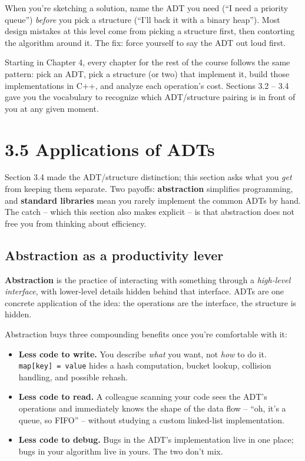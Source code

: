 \documentclass[11pt]{article}
\begin{document}
\begin{ideabox}
When you're sketching a solution, name the ADT you need
(``I need a priority queue'') \emph{before} you pick a structure
(``I'll back it with a binary heap''). Most design mistakes at this
level come from picking a structure first, then contorting the
algorithm around it. The fix: force yourself to say the ADT out
loud first.
\end{ideabox}

\begin{notebox}
Starting in Chapter 4, every chapter for the rest of the course
follows the same pattern: pick an ADT, pick a structure (or two) that
implement it, build those implementations in C++, and analyze each
operation's cost. Sections 3.2 -- 3.4 gave you the vocabulary to
recognize which ADT/structure pairing is in front of you at any
given moment.
\end{notebox}

\section{3.5 Applications of ADTs}

Section 3.4 made the ADT/structure distinction; this section asks
what you \emph{get} from keeping them separate. Two payoffs:
\textbf{abstraction} simplifies programming, and \textbf{standard
libraries} mean you rarely implement the common ADTs by hand. The
catch -- which this section also makes explicit -- is that abstraction
does not free you from thinking about efficiency.

\subsection{Abstraction as a productivity lever}

\begin{defnbox}[Abstraction]
\textbf{Abstraction} is the practice of interacting with something
through a \emph{high-level interface}, with lower-level details
hidden behind that interface. ADTs are one concrete application of
the idea: the operations are the interface, the structure is hidden.
\end{defnbox}

Abstraction buys three compounding benefits once you're comfortable
with it:
\begin{itemize}[leftmargin=*]
  \item \textbf{Less code to write.} You describe \emph{what} you
        want, not \emph{how} to do it. \texttt{map[key] = value}
        hides a hash computation, bucket lookup, collision handling,
        and possible rehash.
  \item \textbf{Less code to read.} A colleague scanning your code
        sees the ADT's operations and immediately knows the shape of
        the data flow -- ``oh, it's a queue, so FIFO'' -- without
        studying a custom linked-list implementation.
  \item \textbf{Less code to debug.} Bugs in the ADT's implementation
        live in one place; bugs in your algorithm live in yours. The
        two don't mix.
\end{itemize}
\end{document}

